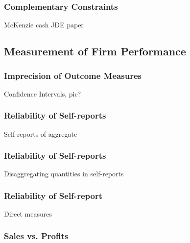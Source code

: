 \documentclass[hideothersubsections, usenames,dvipsnames,10pt]{beamer}
\newenvironment{itemize_3pt}{\itemize\addtolength{\itemsep}{3pt}}{\enditemize}
\begin{document}
\begin{frame}
\frametitle{Complementary Constraints}
	\begin{itemize_3pt}
	\item McKenzie cash JDE paper
	\vspace{0.1in}
	\end{itemize_3pt}
\end{frame}


\subsection{Measurement of Firm Performance}

\begin{frame}
\frametitle{Imprecision of Outcome Measures}
	\begin{itemize_3pt}
	\item Confidence Intervals, pic?
	\vspace{0.1in}
	\end{itemize_3pt}
\end{frame}

\begin{frame}
\frametitle{Reliability of Self-reports}
	\begin{itemize_3pt}
	\item Self-reports of aggregate
	\vspace{0.1in}
	\end{itemize_3pt}
\end{frame}

\begin{frame}
\frametitle{Reliability of Self-reports}
	\begin{itemize_3pt}
	\item Disaggregating quantities in self-reports
	\vspace{0.1in}
	\end{itemize_3pt}
\end{frame}

\begin{frame}
\frametitle{Reliability of Self-report}
	\begin{itemize_3pt}
	\item Direct measures
	\vspace{0.1in}
	\end{itemize_3pt}
\end{frame}


\begin{frame}
\frametitle{Sales vs. Profits}
	\begin{itemize_3pt}
	\item 
	\vspace{0.1in}
	\end{itemize_3pt}
\end{frame}
\end{document}
